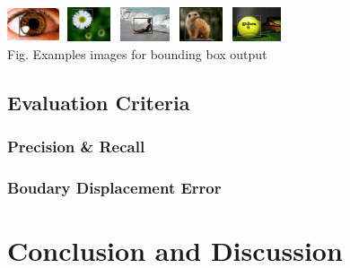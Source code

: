 \documentclass[10pt,twocolumn,letterpaper]{article}
\begin{document}
\begin{center}
    \includegraphics[width=0.6in,height=0.4in]{./Figures/boundingbox/5_155_155096RECT.jpg}
    \includegraphics[width=0.6in,height=0.4in]{./Figures/boundingbox/5_155_155145RECT.jpg}
    \includegraphics[width=0.6in,height=0.4in]{./Figures/boundingbox/5_155_155333RECT.jpg}
    \includegraphics[width=0.6in,height=0.4in]{./Figures/boundingbox/5_155_155196RECT.jpg}
    \includegraphics[width=0.6in,height=0.4in]{./Figures/boundingbox/5_155_155459RECT.jpg} \\
    \footnotesize Fig. Examples images for bounding box output
\end{center}


\subsection{Evaluation Criteria}
\subsubsection{Precision \& Recall}
\subsubsection{Boudary Displacement Error}

\section{Conclusion and Discussion}
\end{document}
